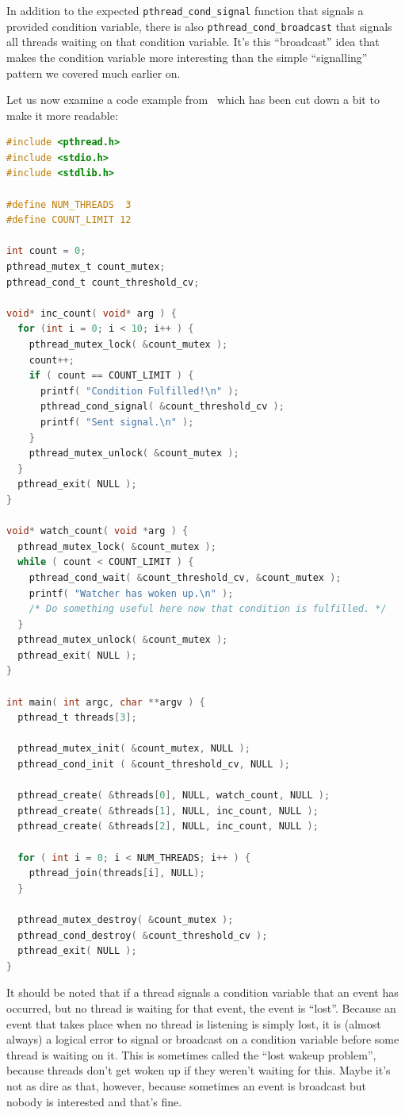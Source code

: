 In addition to the expected \texttt{pthread\_cond\_signal} function that signals a provided condition variable, there is also \texttt{pthread\_cond\_broadcast} that signals all threads waiting on that condition variable. It's this ``broadcast'' idea that makes the condition variable more interesting than the simple ``signalling'' pattern we covered much earlier on.


Let us now examine a code example from~\cite{pthreads} which has been cut down a bit to make it more readable:

\begin{lstlisting}[language=C]
#include <pthread.h>
#include <stdio.h>
#include <stdlib.h>

#define NUM_THREADS  3
#define COUNT_LIMIT 12

int count = 0;
pthread_mutex_t count_mutex;
pthread_cond_t count_threshold_cv;

void* inc_count( void* arg ) {
  for (int i = 0; i < 10; i++ ) {
    pthread_mutex_lock( &count_mutex );
    count++;
    if ( count == COUNT_LIMIT ) {
      printf( "Condition Fulfilled!\n" );
      pthread_cond_signal( &count_threshold_cv );
      printf( "Sent signal.\n" );
    }
    pthread_mutex_unlock( &count_mutex );
  }
  pthread_exit( NULL );
}

void* watch_count( void *arg ) {
  pthread_mutex_lock( &count_mutex );  
  while ( count < COUNT_LIMIT ) {
    pthread_cond_wait( &count_threshold_cv, &count_mutex );
    printf( "Watcher has woken up.\n" );
    /* Do something useful here now that condition is fulfilled. */
  }
  pthread_mutex_unlock( &count_mutex );
  pthread_exit( NULL );
}

int main( int argc, char **argv ) {
  pthread_t threads[3];

  pthread_mutex_init( &count_mutex, NULL );
  pthread_cond_init ( &count_threshold_cv, NULL );

  pthread_create( &threads[0], NULL, watch_count, NULL );
  pthread_create( &threads[1], NULL, inc_count, NULL );
  pthread_create( &threads[2], NULL, inc_count, NULL );

  for ( int i = 0; i < NUM_THREADS; i++ ) {
    pthread_join(threads[i], NULL);
  }
  
  pthread_mutex_destroy( &count_mutex );
  pthread_cond_destroy( &count_threshold_cv );
  pthread_exit( NULL );
}
\end{lstlisting}

It should be noted that if a thread signals a condition variable that an event has occurred, but no thread is waiting for that event, the event is ``lost''.  Because an event that takes place when no thread is listening is simply lost, it is (almost always) a logical error to signal or broadcast on a condition variable before some thread is waiting on it. This is sometimes called the ``lost wakeup problem'', because threads don't get woken up if they weren't waiting for this. Maybe it's not as dire as that, however, because sometimes an event is broadcast but nobody is interested and that's fine.

